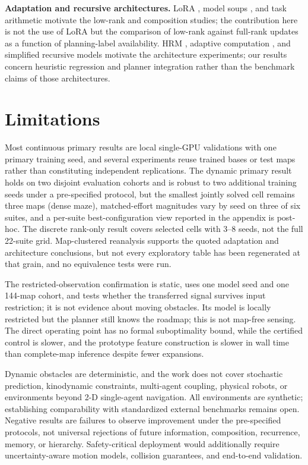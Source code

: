 \documentclass[letterpaper]{article} %
\begin{document}
\textbf{Adaptation and recursive architectures.} LoRA \citep{hu2021lora}, model soups \citep{wortsman2022soups}, and task arithmetic \citep{ilharco2022task} motivate the low-rank and composition studies; the contribution here is not the use of LoRA but the comparison of low-rank against full-rank updates as a function of planning-label availability. HRM \citep{wang2025hrm}, adaptive computation \citep{graves2016act,banino2021pondernet}, and simplified recursive models \citep{jolicoeur2025trm} motivate the architecture experiments; our results concern heuristic regression and planner integration rather than the benchmark claims of those architectures.

\section{Limitations}

Most continuous primary results are local single-GPU validations with one primary training seed, and several experiments reuse trained bases or test maps rather than constituting independent replications. The dynamic primary result holds on two disjoint evaluation cohorts and is robust to two additional training seeds under a pre-specified protocol, but the smallest jointly solved cell remains three maps (dense maze), matched-effort magnitudes vary by seed on three of six suites, and a per-suite best-configuration view reported in the appendix is post-hoc. The discrete rank-only result covers selected cells with 3--8 seeds, not the full 22-suite grid. Map-clustered reanalysis supports the quoted adaptation and architecture conclusions, but not every exploratory table has been regenerated at that grain, and no equivalence tests were run.

The restricted-observation confirmation is static, uses one model seed and one 144-map cohort, and tests whether the transferred signal survives input restriction; it is not evidence about moving obstacles. Its model is locally restricted but the planner still knows the roadmap; this is not map-free sensing. The direct operating point has no formal suboptimality bound, while the certified control is slower, and the prototype feature construction is slower in wall time than complete-map inference despite fewer expansions.

Dynamic obstacles are deterministic, and the work does not cover stochastic prediction, kinodynamic constraints, multi-agent coupling, physical robots, or environments beyond 2-D single-agent navigation. All environments are synthetic; establishing comparability with standardized external benchmarks remains open. Negative results are failures to observe improvement under the pre-specified protocols, not universal rejections of future information, composition, recurrence, memory, or hierarchy. Safety-critical deployment would additionally require uncertainty-aware motion models, collision guarantees, and end-to-end validation.
\end{document}

